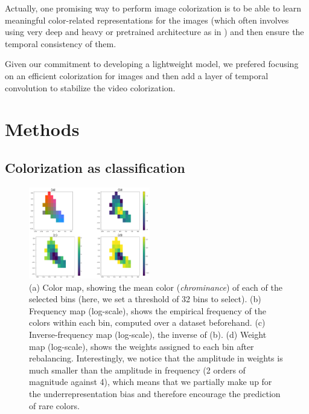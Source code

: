 \documentclass[10pt,twocolumn,letterpaper]{article}
\begin{document}
Actually, one promising way to perform image colorization is to be able to learn meaningful color-related representations for the images (which often involves using very deep and heavy or pretrained architecture as in \cite{larsson2016repres}) and then ensure the temporal consistency of them.

Given our commitment to developing a lightweight model, we prefered focusing on an efficient colorization for images and then add a layer of temporal convolution to stabilize the video colorization.


\section{Methods} \label{methods}

\subsection{Colorization as classification}
\begin{figure}
\begin{center}
\includegraphics[width=200px]{cdexample.png}
\caption{(a) Color map, showing the mean color (\textit{chrominance}) of each of the selected bins (here, we set a threshold of 32 bins to select). (b) Frequency map (log-scale), shows the empirical frequency of the colors within each bin, computed over a dataset beforehand. (c) Inverse-frequency map (log-scale), \ie the inverse of (b). (d) Weight map (log-scale), shows the weights assigned to each bin after rebalancing. Interestingly, we notice that the amplitude in weights is much smaller than the amplitude in frequency (2 orders of magnitude against 4), which means that we partially make up for the underrepresentation bias and therefore encourage the prediction of rare colors.}
\label{cdex}
\end{center}
\end{figure}
\end{document}
